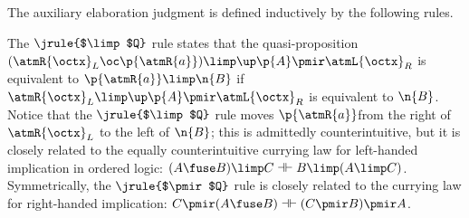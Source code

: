 The auxiliary elaboration judgment is defined inductively by the following rules.
The $\jrule{$\limp$Q}$ rule states that the quasi-proposition $(\atmR{\octx}_L \oc \p{\atmR{a}}) \limp \up \p{A} \pmir \atmL{\octx}_R$ is equivalent to $\p{\atmR{a}} \limp \n{B}$ if $\atmR{\octx}_L \limp \up \p{A} \pmir \atmL{\octx}_R$ is equivalent to $\n{B}$.
Notice that the $\jrule{$\limp$Q}$ rule moves $\p{\atmR{a}}\!\!$ from the right of $\atmR{\octx}_L$ to the left of $\n{B}$;
this is admittedly counterintuitive, but it is closely related to the equally counterintuitive currying law for left-handed implication in ordered logic:
$(A \fuse B) \limp C \dashv\vdash B \limp (A \limp C)$.
Symmetrically, the $\jrule{$\pmir$Q}$ rule is closely related to the currying law for right-handed implication: $C \pmir (A \fuse B) \dashv\vdash (C \pmir B) \pmir A$.

